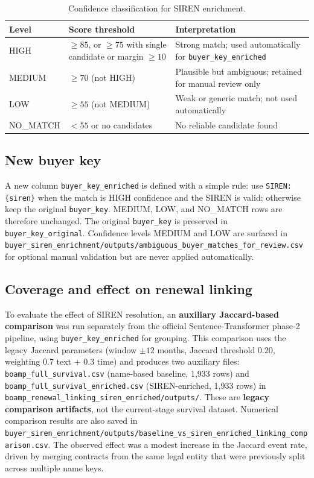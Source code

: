 \documentclass[11pt,a4paper]{article}
\begin{document}
\begin{table}[H]
\centering
\small
\begin{tabularx}{\linewidth}{@{}L{2.4cm}L{4.4cm}Y@{}}
\toprule
\textbf{Level} & \textbf{Score threshold} & \textbf{Interpretation} \\
\midrule
HIGH   & $\geq 85$, or $\geq 75$ with single candidate or margin $\geq 10$ &
         Strong match; used automatically for \texttt{buyer\_key\_enriched} \\
MEDIUM & $\geq 70$ (not HIGH) & Plausible but ambiguous; retained for manual review only \\
LOW    & $\geq 55$ (not MEDIUM) & Weak or generic match; not used automatically \\
NO\_MATCH & $< 55$ or no candidates & No reliable candidate found \\
\bottomrule
\end{tabularx}
\caption{Confidence classification for SIREN enrichment.}
\label{tab:siren-confidence}
\end{table}

\subsection{New buyer key}

A new column \texttt{buyer\_key\_enriched} is defined with a simple rule:
use \texttt{SIREN:\{siren\}} when the match is HIGH confidence and the SIREN is
valid; otherwise keep the original \texttt{buyer\_key}. MEDIUM, LOW, and
NO\_MATCH rows are therefore unchanged.
The original \texttt{buyer\_key} is preserved in \texttt{buyer\_key\_original}.
Confidence levels MEDIUM and LOW are surfaced in
\nolinkurl{buyer_siren_enrichment/outputs/ambiguous_buyer_matches_for_review.csv}
for optional manual validation but are never applied automatically.

\subsection{Coverage and effect on renewal linking}

To evaluate the effect of SIREN resolution, an \textbf{auxiliary Jaccard-based
comparison} was run separately from the official Sentence-Transformer phase-2
pipeline, using \texttt{buyer\_key\_enriched} for grouping. This comparison
uses the legacy Jaccard parameters (window $\pm 12$ months, Jaccard threshold
0.20, weighting 0.7 text + 0.3 time) and produces two auxiliary files:
\nolinkurl{boamp_full_survival.csv} (name-based baseline, 1,933 rows) and
\nolinkurl{boamp_full_survival_enriched.csv} (SIREN-enriched, 1,933 rows) in
\nolinkurl{boamp_renewal_linking_siren_enriched/outputs/}. These are
\textbf{legacy comparison artifacts}, not the current-stage survival dataset.
Numerical comparison results are also saved in
\nolinkurl{buyer_siren_enrichment/outputs/baseline_vs_siren_enriched_linking_comparison.csv}.
The observed effect was a modest increase in the Jaccard event rate, driven by
merging contracts from the same legal entity that were previously split across
multiple name keys.
\end{document}
